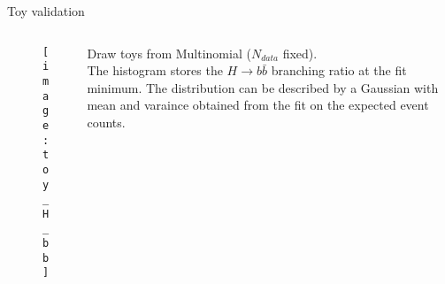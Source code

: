 \begin{block}{Toy validation}
\begin{columns}
\begin{column}{.33\textwidth}
    \begin{figure}
        \centering\texttt{[image: toy\_H\_bb]}
    \end{figure}
\end{column}
\begin{column}{.67\textwidth}
    Draw toys from Multinomial ($N_{data}$ fixed). \\
    The histogram stores the $H\to b\bar{b}$ branching ratio at the fit minimum.
    The distribution can be described by a Gaussian with
    mean and varaince obtained from the fit on the expected event counts.
\end{column}
\end{columns}
\end{block}
